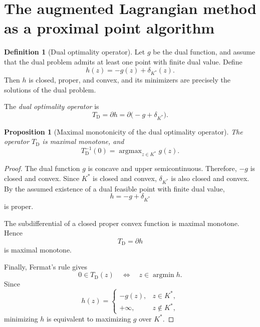 \documentclass[a4paper,11pt]{book}
\theoremstyle{plain}
\newtheorem{proposition}[theorem]{Proposition}
\theoremstyle{definition}
\newtheorem{definition}[theorem]{Definition}
\theoremstyle{remark}
\numberwithin{equation}{chapter}
\numberwithin{algorithm}{chapter}
\DeclareMathOperator*{\argmin}{argmin}
\DeclareMathOperator*{\argmax}{argmax}
\begin{document}
	\section{The augmented Lagrangian method as a proximal point algorithm}
	
	\begin{definition}[Dual optimality operator]
		Let \(g\) be the dual function, and assume that the dual problem admits at
		least one point with finite dual value. Define
		\begin{equation}
			h(z)
			=
			-g(z)+\delta_{K^*}(z).
		\end{equation}
		Then \(h\) is closed, proper, and convex, and its minimizers are precisely
		the solutions of the dual problem.
		
		The \emph{dual optimality operator} is
		\begin{equation}
			T_{\mathrm D}
			=
			\partial h
			=
			\partial\bigl(-g+\delta_{K^*}\bigr).
		\end{equation}
	\end{definition}
	
	\begin{proposition}[Maximal monotonicity of the dual optimality operator]
		The operator \(T_{\mathrm D}\) is maximal monotone, and
		\begin{equation}
			T_{\mathrm D}^{-1}(0)
			=
			\argmax_{z\in K^*}g(z).
		\end{equation}
	\end{proposition}
	
	\begin{proof}
		The dual function \(g\) is concave and upper semicontinuous. Therefore,
		\(-g\) is closed and convex. Since \(K^*\) is closed and convex,
		\(\delta_{K^*}\) is also closed and convex. By the assumed existence of a
		dual feasible point with finite dual value,
		\[
		h=-g+\delta_{K^*}
		\]
		is proper.
		
		The subdifferential of a closed proper convex function is maximal monotone.
		Hence
		\[
		T_{\mathrm D}=\partial h
		\]
		is maximal monotone.
		
		Finally, Fermat's rule gives
		\[
		0\in T_{\mathrm D}(z)
		\quad\Longleftrightarrow\quad
		z\in\argmin h.
		\]
		Since
		\[
		h(z)
		=
		\begin{cases}
			-g(z),&z\in K^*,\\
			+\infty,&z\notin K^*,
		\end{cases}
		\]
		minimizing \(h\) is equivalent to maximizing \(g\) over \(K^*\).
	\end{proof}
	
\end{document}
